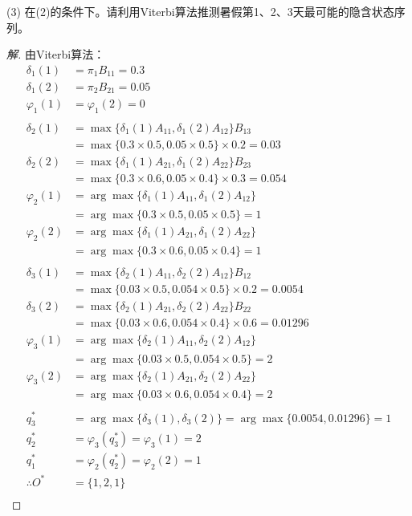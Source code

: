 \documentclass[a4paper]{article}
\begin{document}
(3) 在(2)的条件下。{\color{blue}请利用Viterbi算法推测暑假第1、2、3天最可能的隐含状态序列}。
\begin{proof}[解]
    由Viterbi算法：
    \begin{align*}
        \delta_1(1) & = \pi_1 B_{11} = 0.3 \\
        \delta_1(2) & = \pi_2 B_{21} = 0.05 \\
        \varphi_1(1) & = \varphi_1(2) = 0 \\
        \\
        \delta_2(1) & = \max\{\delta_1(1)A_{11}, \delta_1(2)A_{12}\}B_{13} \\
            & = \max\{0.3 \times 0.5, 0.05 \times 0.5\} \times 0.2 = 0.03 \\
        \delta_2(2) & = \max\{\delta_1(1)A_{21}, \delta_1(2)A_{22}\}B_{23} \\
            & = \max\{0.3 \times 0.6, 0.05 \times 0.4\} \times 0.3 = 0.054 \\
        \varphi_2(1) & = \arg \max\{\delta_1(1)A_{11}, \delta_1(2)A_{12}\} \\
            & = \arg \max\{0.3 \times 0.5, 0.05 \times 0.5\} = 1 \\
        \varphi_2(2) & = \arg \max\{\delta_1(1)A_{21}, \delta_1(2)A_{22}\} \\
            & = \arg \max\{0.3 \times 0.6, 0.05 \times 0.4\} = 1 \\
        \\
        \delta_3(1) & = \max\{\delta_2(1)A_{11}, \delta_2(2)A_{12}\}B_{12} \\
            & = \max\{0.03 \times 0.5, 0.054 \times 0.5\} \times 0.2 = 0.0054 \\
        \delta_3(2) & = \max\{\delta_2(1)A_{21}, \delta_2(2)A_{22}\}B_{22} \\
            & = \max\{0.03 \times 0.6, 0.054 \times 0.4\} \times 0.6 = 0.01296 \\
        \varphi_3(1) & = \arg \max\{\delta_2(1)A_{11}, \delta_2(2)A_{12}\} \\
            & = \arg \max\{0.03 \times 0.5, 0.054 \times 0.5\} = 2 \\
        \varphi_3(2) & = \arg \max\{\delta_2(1)A_{21}, \delta_2(2)A_{22}\} \\
            & = \arg \max\{0.03 \times 0.6, 0.054 \times 0.4\} = 2 \\
        \\
        q_3^* & = \arg \max\{\delta_3(1), \delta_3(2)\} = \arg\max\{0.0054, 0.01296\} = 1 \\
        q_2^* & = \varphi_3(q_3^*) = \varphi_3(1) = 2 \\
        q_1^* & = \varphi_2(q_2^*) = \varphi_2(2) = 1 \\
        \therefore O^* & = \{1, 2, 1\} \\
    \end{align*}
\end{proof}
\end{document}
